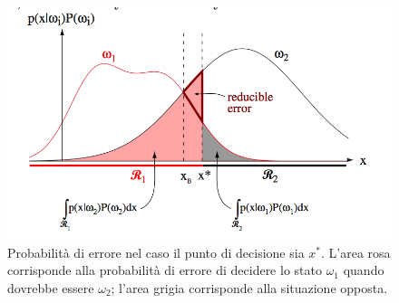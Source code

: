 \begin{figure}
\centering
\includegraphics[scale=0.45]{img/errore.png}
\caption{Probabilità di errore nel caso il punto di decisione sia $x^*$. L'area rosa corrisponde alla probabilità di errore di decidere lo stato $\omega_1$ quando dovrebbe essere $\omega_2$; l'area grigia corrisponde alla situazione opposta.}
\label{errore}
\end{figure}

